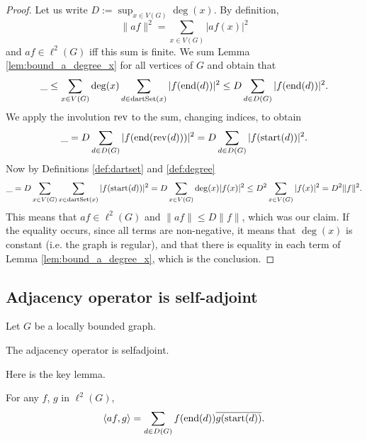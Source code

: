 \begin{proof}
Let us write $D := \sup_{x \in V(G)} \deg(x)$.
By definition,
\begin{equation*}
  \|af\|^2
  = \sum_{x \in V(G)} |af(x)|^2
\end{equation*}
and $af \in \ell^2(G)$ iff this sum is finite.
We sum Lemma \ref{lem:bound_a_degree_x} for all vertices of $G$ and obtain that
\begin{equation*}
  \_
  \leq  \sum_{x \in V(G)} \deg(x) \sum_{d \in \mathrm{dartSet}(x)} |f(\mathrm{end}(d))|^2
  \leq D \sum_{d \in D(G)} |f(\mathrm{end}(d))|^2.
\end{equation*}
We apply the involution $\mathrm{rev}$ to the sum, changing indices, to obtain
\begin{equation*}
  \_
  = D \sum_{d \in D(G)} |f(\mathrm{end}(\mathrm{rev}(d)))|^2
  = D \sum_{d \in D(G)} |f(\mathrm{start}(d))|^2.
\end{equation*}
Now by Definitions \ref{def:dartset} and \ref{def:degree}
\begin{equation*}
  \_ = D \sum_{x \in V(G)} \sum_{x \in \mathrm{dartSet}(x)} |f(\mathrm{start}(d))|^2
  = D \sum_{x \in V(G)} \deg(x) |f(x)|^2
\leq D^2 \sum_{x \in V(G)} |f(x)|^2
  = D^2 \|f\|^2.
\end{equation*}
This means that $af \in \ell^2(G)$ and $\|af\| \leq D \|f\|$, which was our claim.
  If the equality occurs, since all terms are non-negative, it means that
  $\deg (x)$ is constant (i.e. the graph is regular), and that there is equality in
  each term of  Lemma \ref{lem:bound_a_degree_x}, which is the conclusion.
\end{proof}

\subsection{Adjacency operator is self-adjoint}

Let $G$ be a locally bounded graph.

\begin{proposition}
  \label{prop:adjacency_is_selfadjoint}
  The adjacency operator is selfadjoint.
\end{proposition}

Here is the key lemma.

\begin{lemma}
  \label{lem:scalar_of_adjacency}
  For any $f$, $g$ in $\ell^2(G)$,
  \begin{equation}
    \langle af, g \rangle
    = \sum_{d \in D(G)}
    f(\mathrm{end}(d)) \overline{g(\mathrm{start}(d))}.
  \end{equation}
\end{lemma}

